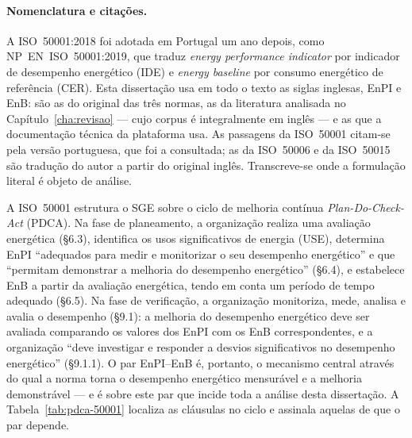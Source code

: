 \paragraph{Nomenclatura e citações.} A ISO~50001:2018 foi adotada
em Portugal um ano depois, como NP~EN~ISO~50001:2019, que traduz
\emph{energy performance indicator} por indicador de desempenho energético
(IDE) e \emph{energy baseline} por consumo energético de referência (CER).
Esta dissertação usa em todo o texto as siglas inglesas, EnPI e EnB: são as
do original das três normas, as da literatura analisada no
Capítulo~\ref{cha:revisao} --- cujo corpus é integralmente em inglês --- e
as que a documentação técnica da plataforma usa. As passagens da ISO~50001
citam-se pela versão portuguesa, que foi a consultada; as da ISO~50006 e da
ISO~50015 são tradução do autor a partir do original inglês. Transcreve-se
onde a formulação literal é objeto de análise.

A ISO~50001 estrutura o SGE sobre o ciclo de melhoria contínua \emph{Plan-Do-Check-Act} (PDCA). Na fase de planeamento, a organização realiza uma avaliação energética (\S6.3), identifica os usos significativos de energia (USE), determina EnPI \enquote{adequados para medir e monitorizar o seu desempenho energético} e que \enquote{permitam demonstrar a melhoria do desempenho energético} (\S6.4), e estabelece EnB a partir da avaliação energética, tendo em conta um período de tempo adequado (\S6.5). Na fase de verificação, a organização monitoriza, mede, analisa e avalia o desempenho (\S9.1): a melhoria do desempenho energético deve ser avaliada comparando
os valores dos EnPI com os EnB correspondentes, e a organização
\enquote{deve investigar e responder a desvios significativos no desempenho
energético} (\S9.1.1). O par EnPI--EnB é, portanto, o mecanismo central através do qual a norma torna o desempenho energético mensurável e a melhoria demonstrável --- e é sobre este par que incide toda a análise desta dissertação.
A Tabela~\ref{tab:pdca-50001} localiza as cláusulas no ciclo e
assinala aquelas de que o par depende.


